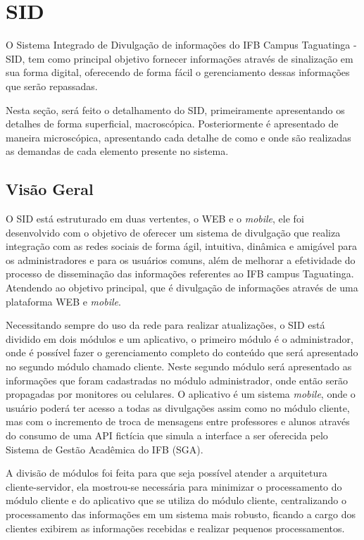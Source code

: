 \chapter[SID]{SID}
\label{cap:sid}
O Sistema Integrado de Divulgação de informações do IFB Campus Taguatinga - SID, tem como principal objetivo fornecer informações através de sinalização em sua forma digital, oferecendo de forma fácil o gerenciamento dessas informações que serão repassadas. 

Nesta seção, será feito o detalhamento do SID, primeiramente apresentando os detalhes de forma superficial, macroscópica. Posteriormente é apresentado de maneira microscópica, apresentando cada detalhe de como e onde são realizadas as demandas de cada elemento presente no sistema. 

\section{Visão Geral} 
O SID está estruturado em duas vertentes, o WEB e o \textit{mobile}, ele foi desenvolvido com o objetivo de oferecer um sistema de divulgação que realiza integração com as redes sociais de forma ágil, intuitiva, dinâmica e amigável para os administradores e para os usuários comuns, além de melhorar a efetividade do processo de disseminação das informações referentes ao IFB campus Taguatinga. Atendendo ao objetivo principal, que é divulgação de informações através de uma plataforma WEB e \textit{mobile}.

Necessitando sempre do uso da rede para realizar atualizações, o SID está dividido em dois módulos e um aplicativo, o primeiro módulo é o administrador, onde é possível fazer o gerenciamento completo do conteúdo que será apresentado no segundo módulo chamado cliente. Neste segundo módulo será apresentado as informações que foram cadastradas no módulo administrador, onde então serão propagadas por monitores ou celulares. O aplicativo é um sistema \textit{mobile}, onde o usuário poderá ter acesso a todas as divulgações assim como no módulo cliente, mas com o incremento de troca de mensagens entre professores e alunos através do consumo de uma API fictícia que simula a interface a ser oferecida pelo Sistema de Gestão Acadêmica do IFB (SGA).

A divisão de módulos foi feita para que seja possível atender a arquitetura cliente-servidor, ela mostrou-se necessária para minimizar o processamento do módulo cliente e do aplicativo que se utiliza do módulo cliente, centralizando o processamento das informações em um sistema mais robusto, ficando a cargo dos clientes exibirem as informações recebidas e realizar pequenos processamentos.

